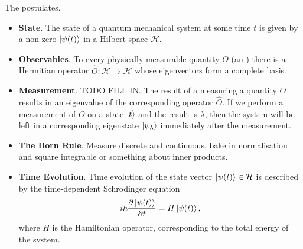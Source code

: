 \documentclass[a4paper]{scrartcl}
\begin{document}
The postulates.

{\color{blue}
\begin{itemize}
    \item \textbf{State}. The state of a quantum mechanical system at some time $t$ is given by a non-zero  $\ket{\psi(t)}$ in a Hilbert space $\mathcal{H}$.
    \item \textbf{Observables}. To every physically measurable quantity $O$ (an ) there is a Hermitian operator $\hat{O}: \mathcal{H} \rightarrow \mathcal{H}$ whose eigenvectors form a complete basis.
    \item \textbf{Measurement}. {\color{red}TODO FILL IN}. The result of a measuring a quantity $O$ results in an eigenvalue of the corresponding operator $\hat{O}$. If we perform a measurement of $O$ on a state $\ket{t}$ and the result is $\lambda$, then the system will be left in a corresponding eigenstate $\ket{\psi_{\lambda}}$ immediately after the measurement.
    \item \textbf{The Born Rule}. Measure discrete and continuous, bake in normalisation and square integrable or something about inner products.
    \item \textbf{Time Evolution}. Time evolution of the state vector $\ket{\psi(t)} \in \mathcal{H}$ is described by the time-dependent Schrodinger equation
    $$
    i \hbar \frac{\partial \ket{\psi(t)}}{\partial t} = H \ket{\psi(t)},
    $$
    where $H$ is the Hamiltonian operator, corresponding to the total energy of the system.
\end{itemize}
}
\end{document}
